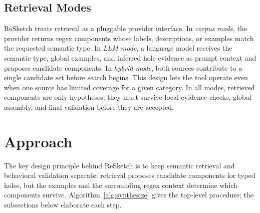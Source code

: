 \documentclass[sigconf,nonacm]{acmart}
\begin{document}
\subsection{Retrieval Modes}
ReSketch treats retrieval as a pluggable provider interface. In \emph{corpus
mode}, the provider returns regex components whose labels, descriptions, or
examples match the requested semantic type. In \emph{LLM mode}, a language
model receives the semantic type, global examples, and inferred hole evidence
as prompt context and proposes candidate components. In \emph{hybrid mode},
both sources contribute to a single candidate set before search begins. This
design lets the tool operate even when one source has limited coverage for a
given category. In all modes, retrieved components are only hypotheses; they
must survive local evidence checks, global assembly, and final validation
before they are accepted.

\section{Approach}
\label{sec:approach}
The key design principle behind ReSketch is to keep semantic retrieval and
behavioral validation separate: retrieval proposes candidate components for
typed holes, but the examples and the surrounding regex context determine which
components survive. Algorithm~\ref{alg:synthesize} gives the top-level
procedure; the subsections below elaborate each step.
\end{document}
